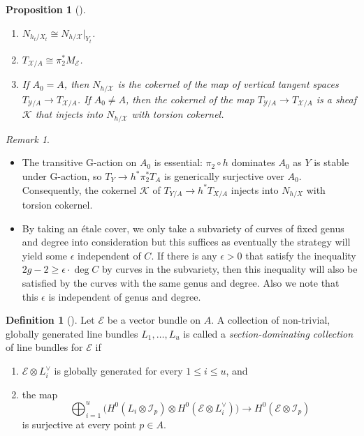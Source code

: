 \documentclass{amsart}
\newtheorem{proposition}[theorem]{Proposition}
\theoremstyle{definition}
\newtheorem{definition}[theorem]{Definition}
\theoremstyle{remark}
\newtheorem{remark}[theorem]{Remark}
\begin{document}
\begin{proposition}[{\cite[Proposition~2.1]{coskun2019algebraichyperbolicitygeneralsurfaces}}]\leavevmode 
\begin{enumerate}
    \item $N_{h_t/X_t} \cong  N_{h/\mathcal X}|_{Y_t}$.
    \item $T_{\mathcal X/A} \cong  \pi_2^* M_{\mathcal E}$.
    \item If $A_0 = A$, then $N_{h/\mathcal X}$ is the cokernel of the map of vertical tangent spaces 
    $T_{\mathcal Y/A} \to T_{\mathcal X/A}$. If $A_0 \ne A$, then the cokernel of the map 
    $T_{\mathcal Y/A} \to T_{\mathcal X/A}$ is a sheaf $\mathcal{K}$ that injects into $N_{h/\mathcal X}$ 
    with torsion cokernel.
\end{enumerate}
\end{proposition}

 \begin{remark}
 \begin{itemize}
     \item The transitive G-action on $A_0$ is essential: $\pi_2 \circ h$ dominates $A_0$ as $Y$ is stable under G-action, so $T_{Y}\to h^{*}\pi_{2}^{*}T_{A}$ is generically surjective over $A_{0}$. Consequently, the cokernel $\mathcal K$ of $T_{Y/A}\to h^{*}T_{X/A}$ injects into $N_{h/X}$ with torsion cokernel.

\item By taking an étale cover, we only take a subvariety of curves of fixed genus and degree into consideration but this suffices as eventually the strategy will yield some $\epsilon$ independent of $C$. If there is any $\epsilon>0$ that satisfy the inequality $2g-2 \geq \epsilon\cdot \deg C$ by curves in the subvariety, then this inequality will also be satisfied by the curves with the same genus and degree. Also we note that this $\epsilon$ is independent of genus and degree.
\end{itemize} 
\end{remark}


\begin{definition} [{\cite[Definition~2.3]{coskun2019algebraichyperbolicitygeneralsurfaces}}]
Let $\mathcal{E}$ be a vector bundle on $A$.
A collection of non-trivial, globally generated line bundles
$L_1, \dots, L_u$ is called a \emph{section-dominating collection}
of line bundles for $\mathcal{E}$ if
\begin{enumerate}
    \item $\mathcal{E} \otimes L_i^{\vee}$ is globally generated for every $1 \leq i \leq u$, and
    \item the map
    \[
    \bigoplus_{i=1}^{u}
    \bigl(H^{0}(L_i \otimes \mathcal{I}_{p}) \otimes H^{0}(\mathcal{E} \otimes L_i^{\vee})\bigr)
    \longrightarrow H^{0}(\mathcal{E} \otimes \mathcal{I}_{p})
    \]
    is surjective at every point $p \in A$.
\end{enumerate}
\end{definition}
\end{document}
